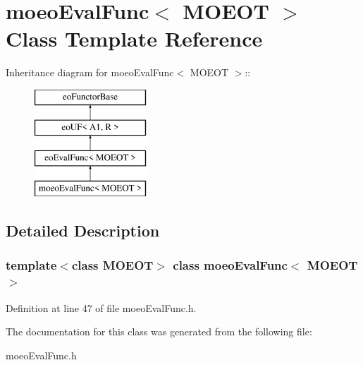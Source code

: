 \section{moeo\-Eval\-Func$<$ MOEOT $>$ Class Template Reference}
\label{classmoeoEvalFunc}
Inheritance diagram for moeo\-Eval\-Func$<$ MOEOT $>$::\begin{figure}[H]
\begin{center}
\leavevmode
\includegraphics[height=4cm]{classmoeoEvalFunc}
\end{center}
\end{figure}


\subsection{Detailed Description}
\subsubsection*{template$<$class MOEOT$>$ class moeo\-Eval\-Func$<$ MOEOT $>$}





Definition at line 47 of file moeo\-Eval\-Func.h.

The documentation for this class was generated from the following file:\begin{CompactItemize}
\item 
moeo\-Eval\-Func.h\end{CompactItemize}
